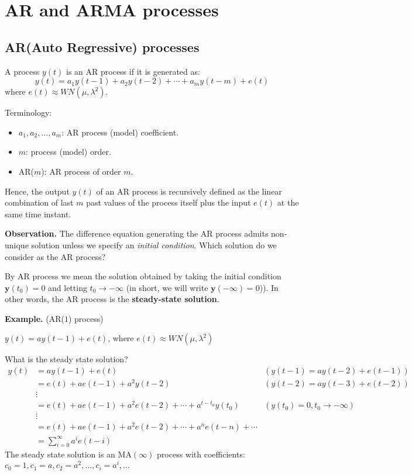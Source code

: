 \section{AR and ARMA processes}

\subsection{AR(Auto Regressive) processes}
A process $y(t)$ is an AR process if it is generated as:
\[
	\boxed{y(t)=a_{1} y(t-1)+a_{2} y(t-2)+\cdots+a_{m} y(t-m)+e(t)}
\]
where $e(t) \approx W N\left(\mu, \lambda^{2}\right)$.

Terminology:
\begin{itemize}
	\item $a_{1}, a_{2}, \ldots, a_{m}$: AR process (model) coefficient.
	\item $m$: process (model) order.
	\item AR($m$): AR process of order $m$.
\end{itemize}
 
Hence, the output $y(t)$ of an AR process is recursively defined as the linear combination of last $m$ past values of the process itself plus the input $e(t)$ at the same time instant.

\textbf{Observation.}
The difference equation generating the AR process admits non-unique solution unless we specify an \emph{initial condition}. Which solution do we consider as the AR process?

By AR process we mean the solution obtained by taking the initial condition $\boxed{\mathbf{y}(t_{0})=0}$ and letting $t_{0} \to -\infty$ (in short, we will write $\mathbf{y}(-\infty)=0$)). In other words, the AR process is the \textbf{steady-state solution}.

\textbf{Example.} (AR($1$) process)

$y(t)=a y(t-1)+e(t)$, where $e(t) \approx W N\left(\mu, \lambda^{2}\right)$

What is the steady state solution?
\begin{align*}
	y(t) & =a y(t-1)+e(t) & (y(t-1)=a y(t-2)+e(t-1)) \\
	& =e(t)+a e(t-1)+a^{2} y(t-2) & (y(t-2)=a y(t-3)+e(t-2)) \\
	& \vdots & \\
	& =e(t)+a e(t-1)+a^{2} e(t-2)+\cdots+a^{t-t_{0}} y\left(t_{0}\right) & (y\left(t_{0}\right)=0,t_{0} \to-\infty) \\
	& \vdots & \\
	& =e(t)+a e(t-1)+a^{2} e(t-2)+\cdots+a^{n} e(t-n)+\cdots\\
	&=\sum_{i=0}^{\infty} a^{i} e(t-i)
\end{align*}
The steady state solution is an $\mathrm{MA}(\infty)$ process with coefficients: $c_{0}=1, c_{1}=a, c_{2}=a^{2}, \ldots, c_{i}=a^{i}, \ldots$

